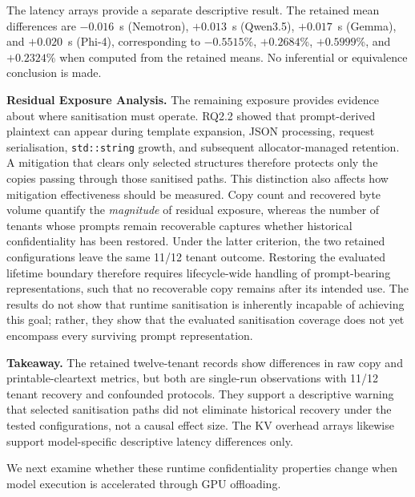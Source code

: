 \documentclass[journal,tifs]{IEEEtran}
\begin{document}
The latency arrays provide a separate descriptive result. The retained
mean differences are $-0.016$~s (Nemotron), $+0.013$~s (Qwen3.5),
$+0.017$~s (Gemma), and $+0.020$~s (Phi-4), corresponding to
$-0.5515$\%, $+0.2684$\%, $+0.5999$\%, and $+0.2324$\% when computed
from the retained means. No inferential or equivalence conclusion is made.


{\bf Residual Exposure Analysis.}
The remaining exposure provides evidence about where sanitisation must
operate. RQ2.2 showed that prompt-derived plaintext can appear during
template expansion, JSON processing, request serialisation,
\texttt{std::string} growth, and subsequent allocator-managed retention.
A mitigation that clears only selected structures therefore protects
only the copies passing through those sanitised paths. This distinction also affects how mitigation effectiveness should be
measured. Copy count and recovered byte volume quantify the
\emph{magnitude} of residual exposure, whereas the number of tenants
whose prompts remain recoverable captures whether historical
confidentiality has been restored. Under the latter criterion, the two
retained configurations leave the same 11/12 tenant outcome.
Restoring the evaluated lifetime boundary therefore requires
lifecycle-wide handling of prompt-bearing representations, such that no
recoverable copy remains after its intended use. The results do not show
that runtime sanitisation is inherently incapable of achieving this
goal; rather, they show that the evaluated sanitisation coverage does
not yet encompass every surviving prompt representation.


{\bf Takeaway.}
The retained twelve-tenant records show differences in raw copy and
printable-cleartext metrics, but both are single-run observations with
11/12 tenant recovery and confounded protocols. They support a descriptive
warning that selected sanitisation paths did not eliminate historical
recovery under the tested configurations, not a causal effect size. The KV
overhead arrays likewise support model-specific descriptive latency
differences only.

We next examine whether these runtime confidentiality properties change
when model execution is accelerated through GPU offloading.
\end{document}
